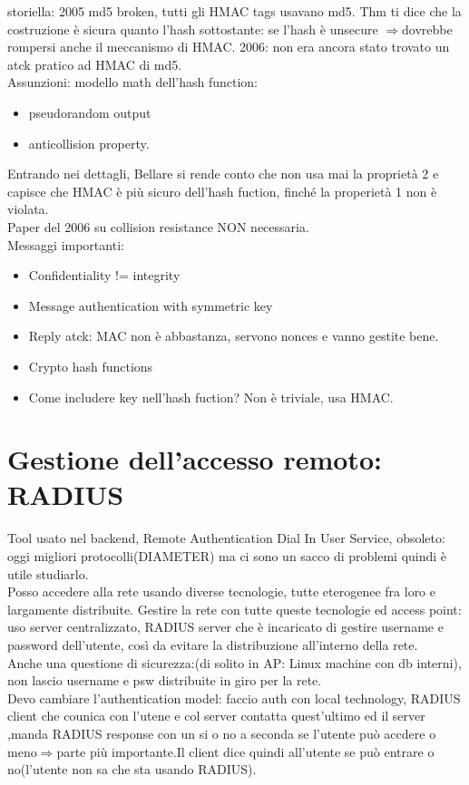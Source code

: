 \documentclass[16px]{article}
\begin{document}
storiella: 2005 md5 broken, tutti gli HMAC tags usavano md5. Thm ti dice che la costruzione è sicura quanto l'hash sottostante: se l'hash è unsecure $\Rightarrow$dovrebbe rompersi anche il meccanismo di HMAC. 2006: non era ancora stato trovato un atck pratico ad HMAC di md5.\\
Assunzioni: modello math dell'hash function:
\begin{itemize}
\item pseudorandom output
\item anticollision property.
\end{itemize}
Entrando nei dettagli, Bellare si rende conto che non usa mai la proprietà 2 e capisce che HMAC è più sicuro dell'hash fuction, finché la properietà 1 non è violata.\\
Paper del 2006 su collision resistance NON necessaria.\\
Messaggi importanti:\\
\begin{itemize}
\item Confidentiality != integrity
\item Message authentication with symmetric key
\item Reply atck: MAC non è abbastanza, servono nonces e vanno gestite bene.
\item Crypto hash functions
\item Come includere key nell'hash fuction? Non è triviale, usa HMAC.
\end{itemize}
\section{Gestione dell'accesso remoto: RADIUS}
Tool usato nel backend, Remote Authentication Dial In User Service, obsoleto:\\
oggi migliori protocolli(DIAMETER) ma ci sono un sacco di problemi quindi è utile studiarlo.\\
Posso accedere alla rete usando diverse tecnologie, tutte eterogenee fra loro e largamente distribuite. Gestire la rete con tutte queste tecnologie ed access point: uso server centralizzato, RADIUS server che è incaricato di gestire username e password dell'utente, così da evitare la distribuzione all'interno della rete.\\Anche una questione di sicurezza:(di solito in AP: Linux machine con db interni), non lascio username e psw distribuite in giro per la rete.\\Devo cambiare l'authentication model: faccio auth con local technology, RADIUS client che counica con l'utene e col server contatta quest'ultimo ed il server ,manda RADIUS response con un si o no a seconda se l'utente può accdere o meno$\Rightarrow$parte più importante.Il client dice quindi all'utente se può entrare o no(l'utente non sa che sta usando RADIUS).\\
\end{document}
